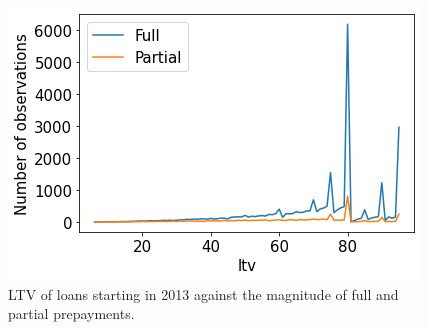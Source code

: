         \begin{figure}
            \centering
            \includegraphics[width=0.6\linewidth]{Latex/Report/Figures/LTV againts Full and Partial prepayments.png}
            \caption{LTV of loans starting in 2013 against the magnitude of full and partial prepayments.}
            \label{model_LTV_against_prepayment}
        \end{figure}
    
